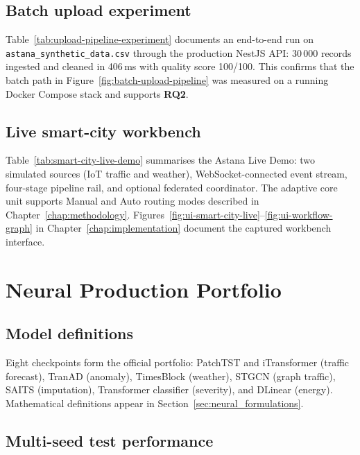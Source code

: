 \subsection{Batch upload experiment}

Table~\ref{tab:upload-pipeline-experiment} documents an end-to-end run on \texttt{astana\_synthetic\_data.csv} through the production NestJS API: 30\,000 records ingested and cleaned in 406\,ms with quality score 100/100. This confirms that the batch path in Figure~\ref{fig:batch-upload-pipeline} was measured on a running Docker Compose stack and supports \textbf{RQ2}.

\subsection{Live smart-city workbench}

Table~\ref{tab:smart-city-live-demo} summarises the Astana Live Demo: two simulated sources (IoT traffic and weather), WebSocket-connected event stream, four-stage pipeline rail, and optional federated coordinator. The adaptive core unit supports Manual and Auto routing modes described in Chapter~\ref{chap:methodology}. Figures~\ref{fig:ui-smart-city-live}--\ref{fig:ui-workflow-graph} in Chapter~\ref{chap:implementation} document the captured workbench interface.

\section{Neural Production Portfolio}
\label{sec:neural_portfolio}

\subsection{Model definitions}

Eight checkpoints form the official portfolio: PatchTST and iTransformer (traffic forecast), TranAD (anomaly), TimesBlock (weather), STGCN (graph traffic), SAITS (imputation), Transformer classifier (severity), and DLinear (energy). Mathematical definitions appear in Section~\ref{sec:neural_formulations}.

\subsection{Multi-seed test performance}


